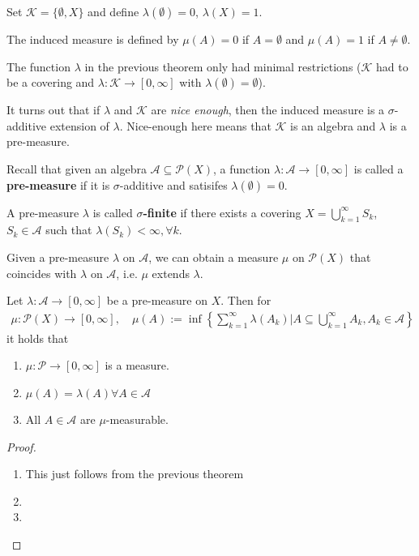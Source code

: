 \begin{ex}[]
  Set $\mathcal{K} = \{\emptyset,X\}$ and define $\lambda(\emptyset) = 0$, $\lambda(X) = 1$.

  The induced measure is defined by $\mu(A) = 0$ if $A = \emptyset$ and $\mu(A) = 1$ if $A \neq \emptyset$.
\end{ex}

The function $\lambda$ in the previous theorem only had minimal restrictions ($\mathcal{K}$ had to be a covering and $\lambda: \mathcal{K} \to  [0,\infty]$ with $\lambda(\emptyset) = \emptyset$).

It turns out that if $\lambda$ and $\mathcal{K}$ are \emph{nice enough}, then the induced measure is a $\sigma$-additive extension of $\lambda$.
Nice-enough here means that $\mathcal{K}$ is an algebra and $\lambda$ is a pre-measure.

Recall that given an algebra $\mathcal{A} \subseteq \mathcal{P}(X)$, 
a function $\lambda: \mathcal{A} \to [0,\infty]$ is called a \textbf{pre-measure} if it is $\sigma$-additive and satisifes $\lambda(\emptyset) = 0$.
\begin{dfn}[]
A pre-measure $\lambda$ is called \textbf{$\sigma$-finite} if there exists a covering $X = \bigcup_{k=1}^{\infty}S_k$, $S_k \in \mathcal{A}$ such that $\lambda(S_k) < \infty, \forall k$.
\end{dfn}
Given a pre-measure $\lambda$ on $\mathcal{A}$, we can obtain a measure $\mu$ on $\mathcal{P}(X)$ that coincides with $\lambda$ on $\mathcal{A}$, i.e. $\mu$ extends $\lambda$.
\begin{thm}
  Let $\lambda: \mathcal{A} \to [0,\infty]$ be a pre-measure on $X$. Then for
  \begin{align*}
    \mu: \mathcal{P}(X) \to [0,\infty],\quad \mu(A) := \inf \left\{
      \sum_{k=1}^{\infty} \lambda(A_k) \big\vert A \subseteq \bigcup_{k=1}^{\infty}A_k, A_k \in \mathcal{A}
    \right\}
  \end{align*}
  it holds that
  \begin{enumerate}
    \item $\mu: \mathcal{P} \to [0,\infty]$ is a measure.
    \item $\mu(A) = \lambda(A) \forall A \in \mathcal{A}$
    \item All $A \in \mathcal{A}$ are $\mu$-measurable.
  \end{enumerate}
\end{thm}
\begin{proof}
\begin{enumerate}
  \item This just follows from the previous theorem
  \item 
  \item 
\end{enumerate}
\end{proof}

